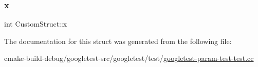 \subsubsection{\texorpdfstring{x}{x}}
{\footnotesize\ttfamily int Custom\+Struct\+::x}



The documentation for this struct was generated from the following file\+:\begin{DoxyCompactItemize}
\item 
cmake-\/build-\/debug/googletest-\/src/googletest/test/\mbox{\hyperlink{googletest-param-test-test_8cc}{googletest-\/param-\/test-\/test.\+cc}}\end{DoxyCompactItemize}
